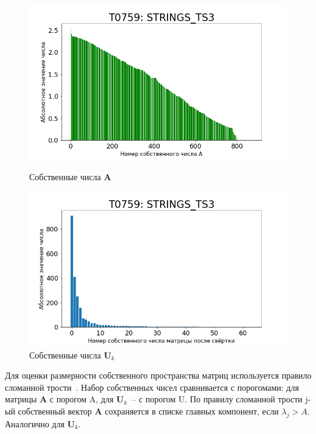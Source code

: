 \documentclass[14pt]{extarticle}
\begin{document}
\begin{figure}[H]
	\begin{minipage}[b]{0.49\textwidth}
		\centering
		\includegraphics[width=1.1\textwidth]{T0759_A_before_conv}
		\caption{Собственные числа $\textbf{A}$}
		\label{A_eigens}
	\end{minipage}
	\hfill
	\begin{minipage}[b]{0.49\textwidth}
		\centering
		\includegraphics[width=1.1\textwidth]{T0759_X_after_conv}
		\caption{Собственные числа $\textbf{U}_k$}
		\label{u_k_eigens}
	\end{minipage}
\end{figure}

 Для оценки размерности собственного пространства матриц используется правило сломанной трости~\cite{Component_retention}. Набор собственных чисел сравнивается с порогомами: для матрицы $\textbf{A}$ с порогом A, для $\textbf{U}_k$~-- с порогом U. По правилу сломанной трости j-ый собственный вектор $\textbf{A}$ сохраняется в списке главных компонент, если $\lambda_j > A$. Аналогично для $\textbf{U}_k$.
 
\end{document}
